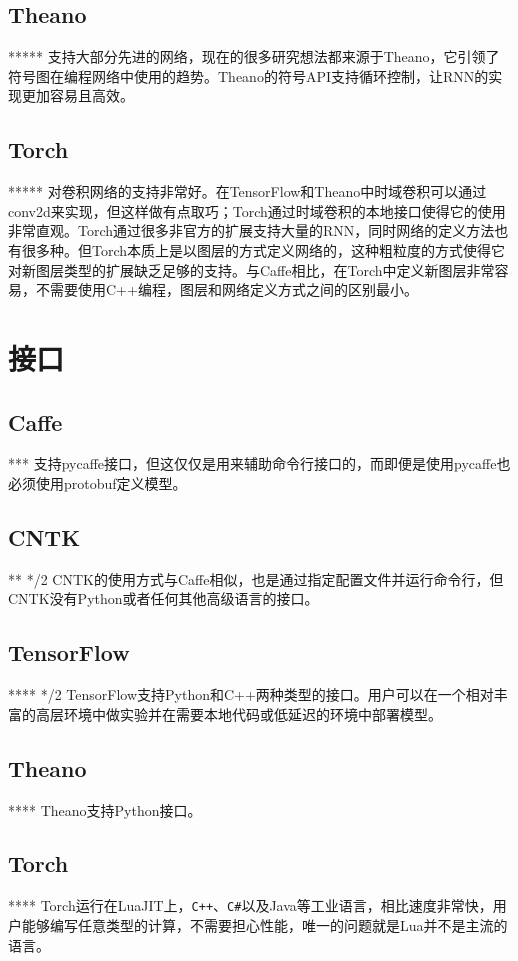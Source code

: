 \documentclass[a4paper,12pt]{ctexart}
\begin{document}
\subsection{Theano}
*****
支持大部分先进的网络，现在的很多研究想法都来源于Theano，它引领了符号图在编程网络中使用的趋势。Theano的符号API支持循环控制，让RNN的实现更加容易且高效。

\subsection{Torch}
*****
对卷积网络的支持非常好。在TensorFlow和Theano中时域卷积可以通过conv2d来实现，但这样做有点取巧；Torch通过时域卷积的本地接口使得它的使用非常直观。Torch通过很多非官方的扩展支持大量的RNN，同时网络的定义方法也有很多种。但Torch本质上是以图层的方式定义网络的，这种粗粒度的方式使得它对新图层类型的扩展缺乏足够的支持。与Caffe相比，在Torch中定义新图层非常容易，不需要使用C++编程，图层和网络定义方式之间的区别最小。

\section{接口}
\subsection{Caffe}*** 支持pycaffe接口，但这仅仅是用来辅助命令行接口的，而即便是使用pycaffe也必须使用protobuf定义模型。
\subsection{CNTK}** */2
CNTK的使用方式与Caffe相似，也是通过指定配置文件并运行命令行，但CNTK没有Python或者任何其他高级语言的接口。
\subsection{TensorFlow}**** */2
TensorFlow支持Python和C++两种类型的接口。用户可以在一个相对丰富的高层环境中做实验并在需要本地代码或低延迟的环境中部署模型。
\subsection{Theano}****
Theano支持Python接口。
\subsection{Torch}****
Torch运行在LuaJIT上，\verb|C++|、\verb|C#|以及Java等工业语言，相比速度非常快，用户能够编写任意类型的计算，不需要担心性能，唯一的问题就是Lua并不是主流的语言。
\end{document}
